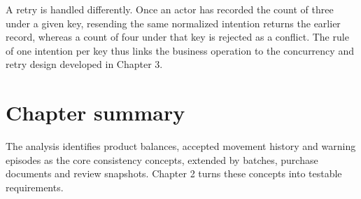 A retry is handled differently. Once an actor has recorded the count of three under a given key, resending the same normalized intention returns the earlier record, whereas a count of four under that key is rejected as a conflict. The rule of one intention per key thus links the business operation to the concurrency and retry design developed in Chapter 3.


\FloatBarrier

\section{Chapter summary}

The analysis identifies product balances, accepted movement history and warning episodes as the core consistency concepts, extended by batches, purchase documents and review snapshots. Chapter 2 turns these concepts into testable requirements.
